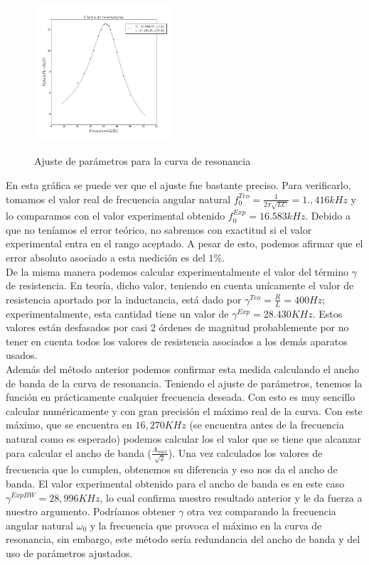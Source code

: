 \documentclass[%
 reprint,
 amsmath,amssymb,
 aps,
]{revtex4-1}
\begin{document}
\begin{figure}[h]
\caption{Ajuste de parámetros para la curva de resonancia}
\centering
\includegraphics[width=0.45\textwidth]{resonancia}
\label{fig:resonancia}
\end{figure}

En esta gráfica se puede ver que el ajuste fue bastante preciso. Para verificarlo, tomamos el valor real de frecuencia angular natural $f_0^{Teo} = \frac{1}{2\pi \sqrt{LC}} = 1.,416kHz$ y lo comparamos con el valor experimental obtenido  $f_0^{Exp} = 16.583kHz$. Debido a que no teníamos el error teórico, no sabremos con exactitud si el valor experimental entra en el rango aceptado. A pesar de esto, podemos afirmar que el error absoluto asociado a esta medición es del $1\%$.\\

De la misma manera podemos calcular experimentalmente el valor del t\'ermino $\gamma$ de resistencia. En teoría, dicho valor, teniendo en cuenta un\'icamente el valor de resistencia aportado por la inductancia, est\'a dado por $\gamma^{Teo} = \frac{R}{L} = 400Hz$; experimentalmente, esta cantidad tiene un valor de $\gamma^{Exp} = 28.430KHz$. Estos valores están desfasados por casi 2 \'ordenes de magnitud probablemente por no tener en cuenta todos los valores de resistencia asociados a los dem\'as aparatos usados.\\

Adem\'as del m\'etodo anterior podemos confirmar esta medida calculando el ancho de banda de la curva de resonancia. Teniendo el ajuste de par\'ametros, tenemos la funci\'on en pr\'acticamente cualquier frecuencia deseada. Con esto es muy sencillo calcular num\'ericamente y con gran precisi\'on el m\'aximo real de la curva. Con este m\'aximo, que se encuentra en $16,270KHz$ (se encuentra antes de la frecuencia natural como es esperado) podemos calcular los el valor que se tiene que alcanzar para calcular el ancho de banda ($\frac{A_{max}}{\sqrt{2}}$). Una vez calculados los valores de frecuencia que lo cumplen, obtenemos su diferencia y eso nos da el ancho de banda. El valor experimental obtenido para el ancho de banda es en este caso $\gamma^{ExpBW} = 28,996KHz$, lo cual confirma nuestro resultado anterior y le da fuerza a nuestro argumento. Podr\'iamos obtener $\gamma$ otra vez comparando la frecuencia angular natural $\omega_0$ y la frecuencia que provoca el m\'aximo en la curva de resonancia, sin embargo, este m\'etodo ser\'ia redundancia del ancho de banda y del uso de par\'ametros ajustados.\\
 
\end{document}
